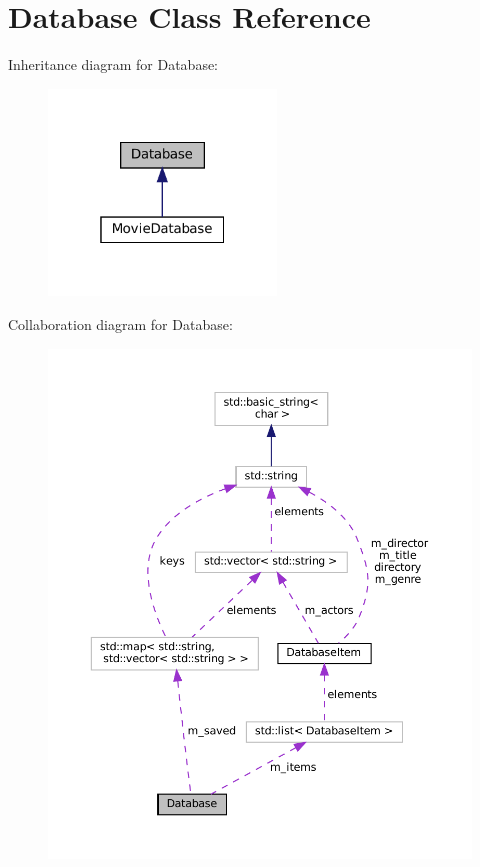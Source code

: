 \hypertarget{classDatabase}{}\section{Database Class Reference}
\label{classDatabase}


 




Inheritance diagram for Database\+:
\nopagebreak
\begin{figure}[H]
\begin{center}
\leavevmode
\includegraphics[width=172pt]{classDatabase__inherit__graph}
\end{center}
\end{figure}


Collaboration diagram for Database\+:
\nopagebreak
\begin{figure}[H]
\begin{center}
\leavevmode
\includegraphics[width=350pt]{classDatabase__coll__graph}
\end{center}
\end{figure}
